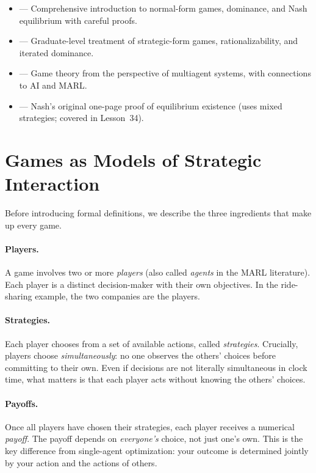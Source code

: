 \documentclass[11pt,a4paper]{article}
\begin{document}
\begin{itemize}[nosep]
    \item \citet[Chapters 1--3]{osborne1994} --- Comprehensive introduction
    to normal-form games, dominance, and Nash equilibrium with careful proofs.
    \item \citet[Chapters 1--2]{fudenberg1991} --- Graduate-level treatment of
    strategic-form games, rationalizability, and iterated dominance.
    \item \citet[Chapters 3--4]{shoham2008} --- Game theory from the
    perspective of multiagent systems, with connections to AI and MARL.
    \item \citet{nash1950} --- Nash's original one-page proof of equilibrium
    existence (uses mixed strategies; covered in Lesson~34).
\end{itemize}


\section{Games as Models of Strategic Interaction}
\label{sec:what_is_game}

Before introducing formal definitions, we describe the three ingredients
that make up every game.

\paragraph{Players.}
A game involves two or more \emph{players} (also called \emph{agents} in
the MARL literature).  Each player is a distinct decision-maker with their
own objectives.  In the ride-sharing example, the two companies are the
players.

\paragraph{Strategies.}
Each player chooses from a set of available actions, called
\emph{strategies}.  Crucially, players choose \emph{simultaneously}: no
one observes the others' choices before committing to their own.  Even if
decisions are not literally simultaneous in clock time, what matters is that
each player acts without knowing the others' choices.

\paragraph{Payoffs.}
Once all players have chosen their strategies, each player receives a
numerical \emph{payoff}.  The payoff depends on \emph{everyone's} choice,
not just one's own.  This is the key difference from single-agent
optimization: your outcome is determined jointly by your action and the
actions of others.
\end{document}
